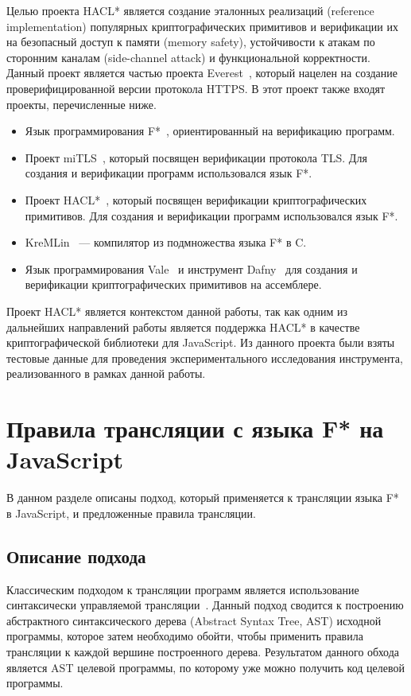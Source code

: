 Целью проекта HACL* является создание эталонных реализаций (reference implementation) популярных криптографических примитивов и верификации их на безопасный доступ к памяти (memory safety), устойчивости к атакам по сторонним каналам (side-channel attack) и функциональной корректности. Данный проект является частью проекта Everest~\cite{everest}, который нацелен на создание проверифицированной версии протокола HTTPS. В этот проект также входят проекты, перечисленные ниже.

\begin{itemize}
    \item Язык программирования F*~\cite{fstar}, ориентированный на верификацию программ.
    \item Проект miTLS~\cite{mitls}, который посвящен верификации протокола TLS. Для создания и верификации программ использовался язык F*.
    \item Проект HACL*~\cite{hacl_star}, который посвящен верификации криптографических примитивов. Для создания и верификации программ использовался язык F*.  
    \item KreMLin~\cite{kremlin} --- компилятор из подмножества языка F* в C.
    \item Язык программирования Vale~\cite{vale} и инструмент Dafny~\cite{dafny} для создания и верификации криптографических примитивов на ассемблере.
\end{itemize}

Проект HACL* является контекстом данной работы, так как одним из дальнейших направлений работы является поддержка HACL* в качестве криптографической библиотеки для JavaScript. Из данного проекта были взяты тестовые данные для проведения экспериментального исследования инструмента, реализованного в рамках данной работы.


\section{Правила трансляции с языка F* на JavaScript}

В данном разделе описаны подход, который применяется к трансляции языка F* в JavaScript, и предложенные правила трансляции.

\subsection{Описание подхода}

Классическим подходом к трансляции программ является использование синтаксически управляемой трансляции~\cite{dragons}. Данный подход сводится к построению абстрактного синтаксического дерева (Abstract Syntax Tree, AST) исходной программы, которое затем необходимо обойти, чтобы применить правила трансляции к каждой вершине построенного дерева. Результатом данного обхода является AST целевой программы, по которому уже можно получить код целевой программы. 

